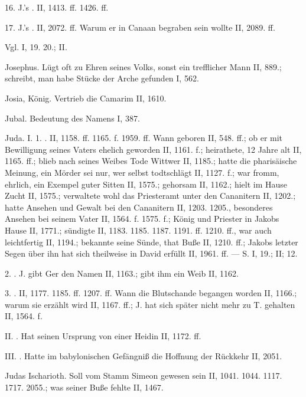 16. J.’s . II, 1413. ff. 1426. ff.

17. J.’s . II, 2072. ff. Warum er in Canaan begraben sein wollte II, 2089. ff.

Vgl.  I, 19. 20.; II.

Josephus. Lügt oft zu Ehren seines Volks, sonst ein trefflicher Mann II, 889.; schreibt, man habe Stücke der Arche gefunden I, 562.

Josia, König. Vertrieb die Camarim II, 1610.

Jubal. Bedeutung des Namens I, 387.

Juda. I. 1. . II, 1158. ff. 1165. f. 1959. ff. Wann geboren II, 548. ff.; ob er mit Bewilligung seines Vaters ehelich geworden II, 1161. f.; heirathete, 12 Jahre alt II, 1165. ff.; blieb nach seines Weibes Tode Wittwer II, 1185.; hatte die pharisäische Meinung, ein Mörder sei nur, wer selbst todtschlägt II, 1127. f.; war fromm, ehrlich, ein Exempel guter Sitten II, 1575.; gehorsam II, 1162.; hielt im Hause Zucht II, 1575.; verwaltete wohl das Priesteramt unter den Cananitern II, 1202.; hatte Ansehen und Gewalt bei den Cananitern II, 1203. 1205., besonderes Ansehen bei seinem Vater II, 1564. f. 1575. f.; König und Priester in Jakobs Hause II, 1771.; sündigte II, 1183. 1185. 1187. 1191. ff. 1210. ff., war auch leichtfertig II, 1194.; bekannte seine Sünde, that Buße II, 1210. ff.; Jakobs letzter Segen über ihn hat sich theilweise in David erfüllt II, 1961. ff. — S.  I, 19.; II;  12.

2. . J. gibt Ger den Namen II, 1163.; gibt ihm ein Weib II, 1162.

3. . II, 1177. 1185. ff. 1207. ff. Wann die Blutschande begangen worden II, 1166.; warum sie erzählt wird II, 1167. ff.; J. hat sich später nicht mehr zu T. gehalten II, 1564. f.

II. . Hat seinen Ursprung von einer Heidin II, 1172. ff.

III. . Hatte im babylonischen Gefängniß die Hoffnung der Rückkehr II, 2051.

Judas Ischarioth. Soll vom Stamm Simeon gewesen sein II, 1041. 1044. 1117. 1717. 2055.; was seiner Buße fehlte II, 1467.

